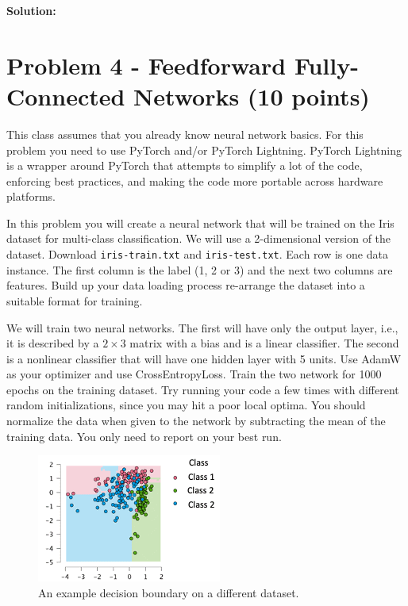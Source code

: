 \documentclass[11pt, oneside]{article}   	%
\begin{document}
\textbf{Solution:} \\



\section*{Problem 4 - Feedforward Fully-Connected Networks (10 points)}
This class assumes that you already know neural network basics. For this problem you need to use PyTorch and/or PyTorch Lightning. PyTorch Lightning is a wrapper around PyTorch that attempts to simplify a lot of the code, enforcing best practices, and making the code more portable across hardware platforms.

In this problem you will create a neural network that will be trained on the Iris dataset for multi-class classification. We will use a 2-dimensional version of the dataset. Download \texttt{iris-train.txt} and \texttt{iris-test.txt}. Each row is one data instance. The first column is the label (1, 2 or 3) and the next two columns are features. Build up your data loading process re-arrange the dataset into a suitable format for training. 

We will train two neural networks. The first will have only the output layer, i.e., it is described by a $2 \times 3$ matrix with a bias and is a linear classifier. The second is a nonlinear classifier that will have one hidden layer with 5 units.  Use AdamW as your optimizer and use CrossEntropyLoss. Train the two network for 1000 epochs on the training dataset. Try running your code a few times with different random initializations, since you may hit a poor local optima. You should normalize the data when given to the network by subtracting the mean of the training data. You only need to report on your best run.

\begin{figure}
    \centering
    \includegraphics{example.png}
    \caption{An example decision boundary on a different dataset.}
    \label{fig:example}
\end{figure}
\end{document}
